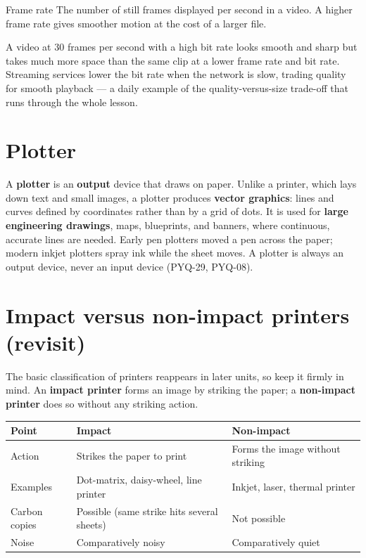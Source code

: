 \begin{definitionbox}{Frame rate}
The number of still frames displayed per second in a video. A higher frame
rate gives smoother motion at the cost of a larger file.
\end{definitionbox}

\begin{example}
A video at 30 frames per second with a high bit rate looks smooth and sharp
but takes much more space than the same clip at a lower frame rate and bit
rate. Streaming services lower the bit rate when the network is slow, trading
quality for smooth playback --- a daily example of the quality-versus-size
trade-off that runs through the whole lesson.
\end{example}

\section{Plotter}
A \textbf{plotter} is an \textbf{output} device that draws on paper. Unlike a
printer, which lays down text and small images, a plotter produces
\textbf{vector graphics}: lines and curves defined by coordinates rather than
by a grid of dots. It is used for \textbf{large engineering drawings}, maps,
blueprints, and banners, where continuous, accurate lines are needed. Early
pen plotters moved a pen across the paper; modern inkjet plotters spray ink
while the sheet moves. A plotter is always an output device, never an input
device (PYQ-29, PYQ-08).

\section{Impact versus non-impact printers (revisit)}
The basic classification of printers reappears in later units, so keep it
firmly in mind. An \textbf{impact printer} forms an image by striking the
paper; a \textbf{non-impact printer} does so without any striking action.

\begin{center}
\begin{tabular}{p{}p{}p{}}
\toprule
\textbf{Point} & \textbf{Impact} & \textbf{Non-impact} \\
\midrule
Action & Strikes the paper to print & Forms the image without striking \\
Examples & Dot-matrix, daisy-wheel, line printer & Inkjet, laser, thermal printer \\
Carbon copies & Possible (same strike hits several sheets) & Not possible \\
Noise & Comparatively noisy & Comparatively quiet \\
\bottomrule
\end{tabular}
\end{center}

